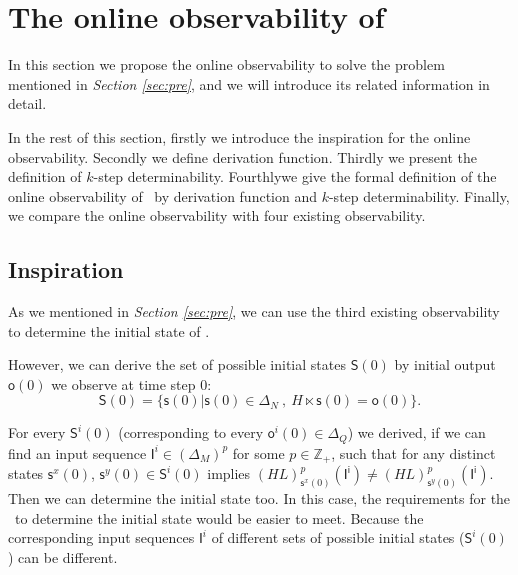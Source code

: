 \section{The online observability of \BCNs}
\label{sec:online}


In this section we propose the online observability to solve the problem mentioned in {\em Section \ref{sec:pre}}, and we will introduce its related information in detail. 

In the rest of this section, firstly we introduce the inspiration for the online observability. Secondly we define derivation function. Thirdly we present the definition of $k$-step determinability. Fourthlywe give the formal definition of the online observability of \BCNs\ by derivation function and $k$-step determinability. Finally, we compare the online observability with four existing observability.


\subsection{Inspiration}


As we mentioned in {\em Section \ref{sec:pre}}, we can use the third existing observability to determine the initial state of \BCN. 

However, we can derive the set of possible initial states $\mathsf{S}(0)$ by initial output $\mathsf{o}(0)$ we observe at time step $0$:
\[\mathsf{S}(0)=\{\mathsf{s}(0)|\mathsf{s}(0)\in \Delta_N\ ,\ H\ltimes \mathsf{s}(0)=\mathsf{o}(0)\}.\]

For every $\mathsf{S}^{i}(0)$ (corresponding to every $\mathsf{o}^{i}(0)\in \Delta_Q$) we derived, if we can find an input sequence $\mathsf{I}^{i}\in(\Delta_M)^p$ for some $p\in \mathbb{Z}_+$, such that for any distinct states $\mathsf{s}^{x}(0)$, $\mathsf{s}^{y}(0) \in \mathsf{S}^{i}(0)$ implies $(HL)^p_{\mathsf{s}^{x}(0)}(\mathsf{I^i})\neq (HL)^p_{\mathsf{s}^{y}(0)}(\mathsf{I^i})$. 
Then we can determine the initial state too. 
In this case, the requirements for the \BCN\ to determine the initial state would be easier to meet. Because the corresponding input sequences $\mathsf{I}^{i}$ of different sets of possible initial states ($\mathsf{S}^{i}(0)$) can be different. 

